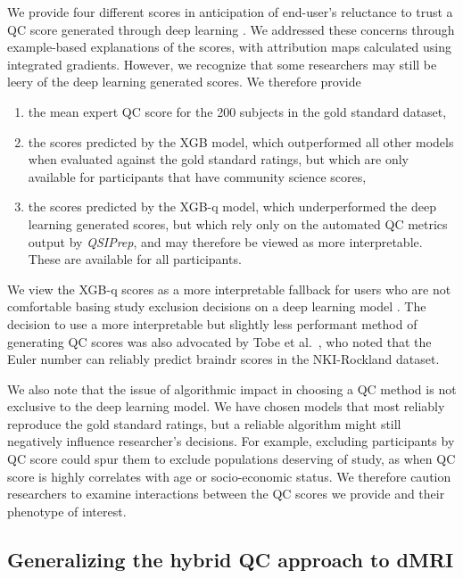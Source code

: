 \documentclass[fleqn,10pt]{wlscirep}
\begin{document}
We provide four different scores in anticipation of end-user's reluctance to
trust a QC score generated through deep learning \cite{lipton2017doctor,
salahuddin2022transparency, Zech2018-ki}. We addressed these concerns through
example-based explanations of the scores, with attribution maps calculated using
integrated gradients. However, we recognize that some researchers may still be
leery of the deep learning generated scores. We therefore provide
\begin{enumerate}
    \item the mean expert QC score for the 200 subjects in the gold standard
    dataset,
    \item the scores predicted by the XGB model, which outperformed all other models
    when evaluated against the gold standard ratings, but which are only available
    for participants that have community science scores,
    \item the scores predicted by the XGB-q model, which underperformed the deep
    learning generated scores, but which rely only on the automated QC metrics
    output by \emph{QSIPrep}, and may therefore be viewed as more interpretable.
    These are available for all participants.
\end{enumerate}
We view the XGB-q scores as a more interpretable fallback for users who are not
comfortable basing study exclusion decisions on a deep learning model
\cite{rudin2019stop}. The decision to use a more interpretable but slightly less
performant method of generating QC scores was also advocated by Tobe et
al.~\cite{tobe2021longitudinal}, who noted that the Euler number can reliably
predict braindr scores in the NKI-Rockland dataset.

We also note that the issue of algorithmic impact in choosing a QC method is not
exclusive to the deep learning model. We have chosen models that most reliably
reproduce the gold standard ratings, but a reliable algorithm might still
negatively influence researcher's decisions. For example, excluding participants
by QC score could spur them to exclude populations deserving of study, as when
QC score is highly correlates with age or socio-economic status. We therefore
caution researchers to examine interactions between the QC scores we provide and
their phenotype of interest.

\subsection*{Generalizing the hybrid QC approach to dMRI}
\end{document}
